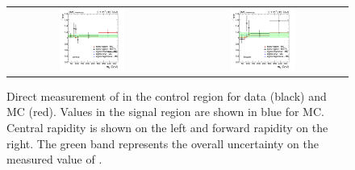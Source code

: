 \begin{figure}[htb]
  \begin{center}
    \begin{tabular}{cc}
      \includegraphics[width=0.4\textwidth]{bkgd/figs/plot_rsfof_mll_central.png} &
      \includegraphics[width=0.4\textwidth]{bkgd/figs/plot_rsfof_mll_forward.png} \\
    \end{tabular}
    \caption{
      Direct measurement of \rsfof in the control region for data (black) and \ttbar MC (red).
      Values in the signal region are shown in blue for \ttbar MC. Central rapidity is shown on the left and forward rapidity on the right.
      The green band represents the overall uncertainty on the measured value of \rsfof.
    }
    \label{fig:rsfof}
  \end{center}
\end{figure}

